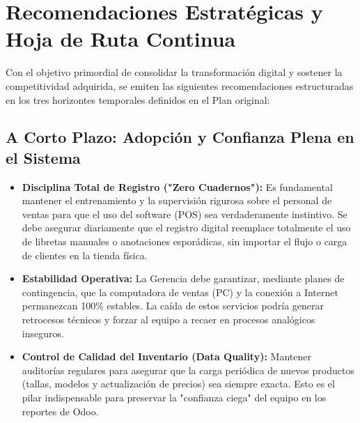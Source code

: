 \section{Recomendaciones Estratégicas y Hoja de Ruta Continua}

Con el objetivo primordial de consolidar la transformación digital y sostener la competitividad adquirida, se emiten las siguientes recomendaciones estructuradas en los tres horizontes temporales definidos en el Plan original:

\subsection{A Corto Plazo: Adopción y Confianza Plena en el Sistema}
\begin{itemize}
    \item \textbf{Disciplina Total de Registro ("Zero Cuadernos"):} Es fundamental mantener el entrenamiento y la supervisión rigurosa sobre el personal de ventas para que el uso del software (POS) sea verdaderamente instintivo. Se debe asegurar diariamente que el registro digital reemplace totalmente el uso de libretas manuales o anotaciones esporádicas, sin importar el flujo o carga de clientes en la tienda física.
    \item \textbf{Estabilidad Operativa:} La Gerencia debe garantizar, mediante planes de contingencia, que la computadora de ventas (PC) y la conexión a Internet permanezcan 100\% estables. La caída de estos servicios podría generar retrocesos técnicos y forzar al equipo a recaer en procesos analógicos inseguros.
    \item \textbf{Control de Calidad del Inventario (Data Quality):} Mantener auditorías regulares para asegurar que la carga periódica de nuevos productos (tallas, modelos y actualización de precios) sea siempre exacta. Esto es el pilar indispensable para preservar la "confianza ciega" del equipo en los reportes de Odoo.
\end{itemize}

